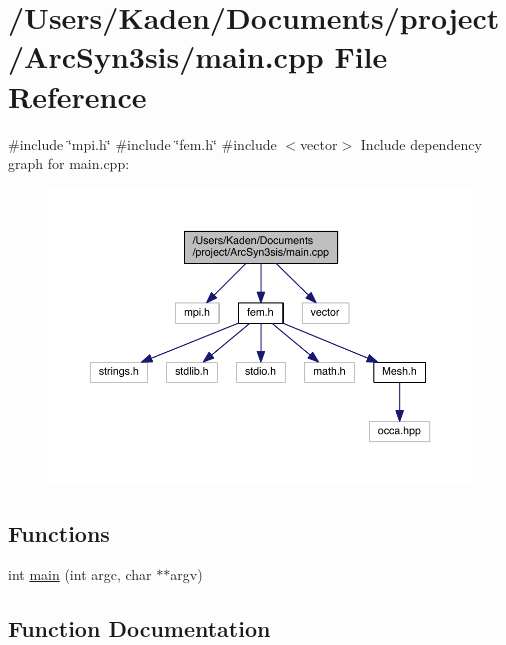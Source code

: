 \hypertarget{a00566}{}\section{/\+Users/\+Kaden/\+Documents/project/\+Arc\+Syn3sis/main.cpp File Reference}
\label{a00566}
{\ttfamily \#include \char`\"{}mpi.\+h\char`\"{}}\newline
{\ttfamily \#include \char`\"{}fem.\+h\char`\"{}}\newline
{\ttfamily \#include $<$vector$>$}\newline
Include dependency graph for main.\+cpp\+:\nopagebreak
\begin{figure}[H]
\begin{center}
\leavevmode
\includegraphics[width=350pt]{a00567}
\end{center}
\end{figure}
\subsection*{Functions}
\begin{DoxyCompactItemize}
\item 
int \hyperlink{a00566_a3c04138a5bfe5d72780bb7e82a18e627}{main} (int argc, char $\ast$$\ast$argv)
\end{DoxyCompactItemize}


\subsection{Function Documentation}
\mbox{\label{a00566_a3c04138a5bfe5d72780bb7e82a18e627}} 
